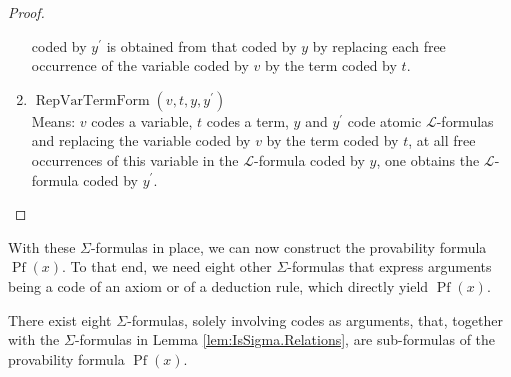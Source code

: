 \begin{proof}
\begin{enumerate}
        coded by $y^\prime$ is obtained from that coded by $y$ by replacing each free occurrence of 
        the variable coded by $v$ by the term coded by $t$.
        \item $\operatorname{RepVarTermForm}(v, t, y, y^\prime)$\\
        Means: $v$ codes a variable, $t$ codes a term, $y$ and $y^\prime$ code atomic 
        $\mathcal{L}$-formulas and replacing the variable coded by $v$ by the term coded by $t$, 
        at all free occurrences of this variable in the $\mathcal{L}$-formula coded by $y$, 
        one obtains the $\mathcal{L}$-formula coded by $y^\prime$.
    \end{enumerate}
\end{proof}

With these $\Sigma$-formulas in place, 
we can now construct the provability formula $\operatorname{Pf}(x)$.
To that end, we need eight other $\Sigma$-formulas that express arguments being 
a code of an axiom or of a deduction rule, which directly yield $\operatorname{Pf}(x)$.

\begin{lemma}
    \label{lem:IsSigma.Ax+...+IsSigma.Pf}
    There exist eight $\Sigma$-formulas, solely involving codes as arguments, that, together with
    the $\Sigma$-formulas in Lemma \ref{lem:IsSigma.Relations}, are sub-formulas of
    the provability formula $\operatorname{Pf}(x)$.
\end{lemma}

